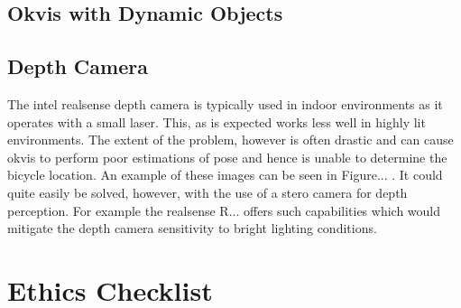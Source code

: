 \documentclass[a4paper,11pt,notitlepage]{article}
\begin{document}
\subsection{Okvis with Dynamic Objects}


\subsection{Depth Camera}

The intel realsense depth camera is typically used in indoor environments as it operates with a small laser. This, as is expected works less well in highly lit environments. The extent of the problem, however is often drastic and can cause okvis to perform poor estimations of pose and hence is unable to determine the bicycle location. An example of these images can be seen in Figure... . It could quite easily be solved, however, with the use of a stero camera for depth perception. For example the realsense R... offers such capabilities which would mitigate the depth camera sensitivity to bright lighting conditions.




\section{Ethics Checklist}


\end{document}
